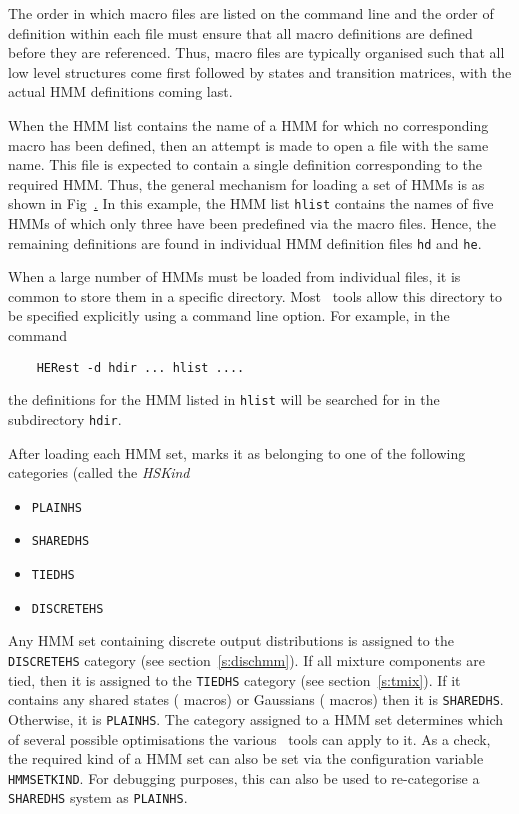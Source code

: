 The order in which macro files are listed on
the command line and the order of definition within
each file must ensure that all macro
definitions are defined before they are referenced.
Thus, macro files are typically organised such that all
low level structures come first followed by states and
transition matrices, with the actual HMM definitions coming last.


When the HMM list contains the name of a HMM for which no corresponding
macro has been defined, then an attempt is made to open a file with the
same name.  This file is expected to contain a single definition 
corresponding to the required HMM.  Thus, the general mechanism for
loading a set of HMMs is as shown in Fig~\href{f:hsetdef}.  In this
example, the HMM list \texttt{hlist} contains the names of five HMMs 
of which
only three have been predefined via the macro files.  Hence, the
remaining definitions are found in individual HMM definition files
\texttt{hd} and \texttt{he}.

When a large number of HMMs must be loaded from individual files, it is
common to store them in a specific directory.  Most \HTK\ tools allow
this directory to be specified explicitly using a command line option.
For example, in the command
\begin{verbatim}
    HERest -d hdir ... hlist ....
\end{verbatim}
the definitions for the HMM listed in \texttt{hlist} will be
searched for in the subdirectory \texttt{hdir}.


After loading each HMM set,  marks it as belonging
to one of the following categories (called the \textit{HSKind}
\begin{itemize}
\item \texttt{PLAINHS}
\item \texttt{SHAREDHS}
\item \texttt{TIEDHS}
\item \texttt{DISCRETEHS}
\end{itemize}


Any HMM set containing discrete output distributions is assigned
to the \texttt{DISCRETEHS} category (see section~\ref{s:dischmm}).  
If all mixture components are tied, then it
is assigned to the \texttt{TIEDHS} category (see section~\ref{s:tmix}).  
If it contains any shared states ( macros) 
or Gaussians ( macros) then it is \texttt{SHAREDHS}.
Otherwise, it is \texttt{PLAINHS}. The  category assigned
to a HMM set determines which of several possible optimisations
the various \HTK\ tools can apply to it.  As a check, the required kind of
a HMM set can also be set via the configuration variable \texttt{HMMSETKIND}.
For debugging purposes, this can also be used to re-categorise a 
\texttt{SHAREDHS} system as \texttt{PLAINHS}.

